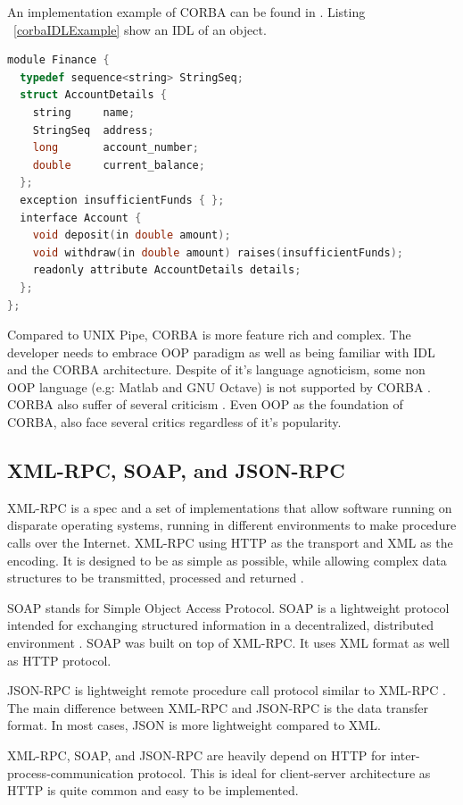 \documentclass[conference]{IEEEtran}
\begin{document}
An implementation example of CORBA can be found in . Listing ~\ref{corbaIDLExample} show an IDL of an object.

\begin{lstlisting}[caption=CORBA IDL Example in C++, label=corbaIDLExample, language=c, basicstyle=\small, breaklines=true]
module Finance {
  typedef sequence<string> StringSeq;
  struct AccountDetails {
    string     name;
    StringSeq  address;
    long       account_number;
    double     current_balance;
  };
  exception insufficientFunds { };
  interface Account {
    void deposit(in double amount);
    void withdraw(in double amount) raises(insufficientFunds);
    readonly attribute AccountDetails details;
  };
};
\end{lstlisting}

Compared to UNIX Pipe, CORBA is more feature rich and complex. The developer needs to 
embrace OOP paradigm as well as being familiar with IDL and the CORBA architecture. 
Despite of it's language agnoticism, some non OOP language (e.g: Matlab and GNU Octave) 
is not supported by CORBA \cite{feilhauer2016def}. CORBA also suffer of several 
criticism \cite{henning2006rise}. Even OOP as the foundation of CORBA, also face several 
critics \cite{hadar2013intuition} regardless of it's popularity.


\subsection{XML-RPC, SOAP, and JSON-RPC}

XML-RPC is a spec and a set of implementations that allow software running on 
disparate operating systems, running in different environments to make procedure 
calls over the Internet. XML-RPC using HTTP as the transport and XML as the encoding. It is designed to be as simple as possible, while allowing complex data structures to be transmitted, processed and returned \cite{xmlrpc}.

SOAP stands for Simple Object Access Protocol. SOAP is a lightweight protocol 
intended for exchanging structured information in a decentralized, distributed 
environment \cite{soap}. SOAP was built on top of XML-RPC. It uses XML format as 
well as HTTP protocol.

JSON-RPC is lightweight remote procedure call protocol similar to XML-RPC 
\cite{jsonrpc}. The main difference between XML-RPC and JSON-RPC is the data transfer
format. In most cases, JSON is more lightweight compared to XML.

XML-RPC, SOAP, and JSON-RPC are heavily depend on HTTP for inter-process-communication 
protocol. This is ideal for client-server architecture as HTTP is quite common and
easy to be implemented.
\end{document}
